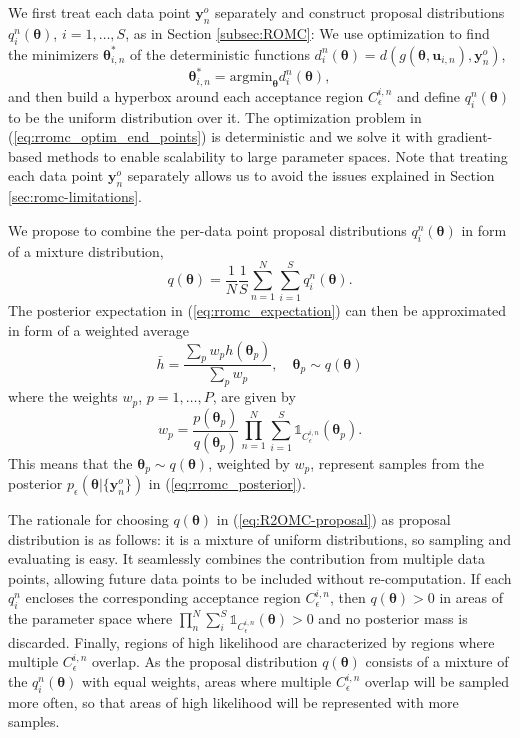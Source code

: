 \documentclass[twoside]{article}
\newcommand{\thb}{\boldsymbol{\theta}}
\newcommand{\ub}{\mathbf{u}}
\newcommand{\data}{\mathbf{y}^o}
\begin{document}
We first treat each data point $\data_n$ separately and construct proposal distributions $q_i^n(\thb)$, $i=1, \ldots, S$, as in Section \ref{subsec:ROMC}: We use optimization to find the minimizers $\thb_{i,n}^*$ of the deterministic functions $d_i^n(\thb) = d(g(\thb, \ub_{i,n}), \data_n)$,       
\begin{equation}
 \thb_{i,n}^* = \text{argmin}_{\thb} d_i^n(\thb),
 \label{eq:rromc_optim_end_points}
\end{equation}
and then build a hyperbox around each acceptance region $C_{\epsilon}^{i,n}$ and define $q_i^n(\thb)$ to be the uniform distribution over it. The optimization problem in (\ref{eq:rromc_optim_end_points}) is deterministic and we solve it with gradient-based methods to enable scalability to large parameter spaces. Note that treating each data point $\data_n$ separately allows us to avoid the issues explained in Section \ref{sec:romc-limitations}.

We propose to combine the per-data point proposal distributions $q_i^n(\thb)$ in form of a mixture distribution,
\begin{equation}
    q(\thb) = \frac{1}{N} \frac{1}{S} \sum_{n=1}^N \sum_{i=1}^S q_i^n (\thb).
    \label{eq:R2OMC-proposal}
\end{equation}
The posterior expectation in (\ref{eq:rromc_expectation}) can then be approximated in form of a weighted average 
\begin{equation}
  \label{eq:rromc_sample_expectation}
  \bar{h} = \frac{\sum_p w_p h(\thb_p)}{\sum_p w_p}, \quad \thb_p \sim q(\thb)
\end{equation}
where the weights $w_p$, $p=1, \ldots, P$, are given by
\begin{equation}
  \label{eq:rromc_weight}
w_p= \frac{p(\thb_p)}{q(\thb_p)} \prod_{n=1}^N \sum_{i=1}^S \mathbb{1}_{C_{\epsilon}^{i,n}}(\thb_p). 
\end{equation}
This means that the $\thb_p \sim q(\thb)$, weighted by $w_p$, represent samples from the posterior $p_{\epsilon}(\thb | \{\data_n\})$ in (\ref{eq:rromc_posterior}).

The rationale for choosing $q(\thb)$ in (\ref{eq:R2OMC-proposal}) as proposal distribution is as follows: it is a mixture of uniform distributions, so sampling and evaluating is easy. It seamlessly combines the contribution from multiple data points, allowing future data points to be included without re-computation. If each $q_i^n$ encloses the corresponding acceptance region $C_{\epsilon}^{i,n}$, then $q(\thb) > 0$ in areas of the parameter space where $\prod_n^N \sum_i^S \mathbb{1}_{C_{\epsilon}^{i,n}}(\thb) > 0$ and no posterior mass is discarded. Finally, regions of high likelihood are characterized by regions where multiple $C_{\epsilon}^{i,n}$ overlap. As the proposal distribution $q(\thb)$ consists of a mixture of the $q_i^n(\thb)$ with equal weights, areas where multiple $C_{\epsilon}^{i,n}$ overlap will be sampled more often, so that areas of high likelihood will be represented with more samples.
\end{document}
